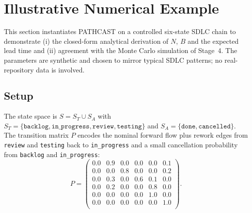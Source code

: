 %

\section{Illustrative Numerical Example}
\label{sec:numerical-example}

This section instantiates PATHCAST on a controlled six-state SDLC
chain to demonstrate (i) the closed-form analytical derivation of
$N$, $B$ and the expected lead time and (ii) agreement with the
Monte Carlo simulation of Stage~4. The parameters are synthetic and
chosen to mirror typical SDLC patterns; no real-repository data is
involved.

\subsection{Setup}
\label{sec:num-setup}

The state space is $S = S_T \cup S_A$ with
$S_T = \{\texttt{backlog}, \texttt{in\_progress}, \texttt{review},
\texttt{testing}\}$ and
$S_A = \{\texttt{done}, \texttt{cancelled}\}$. The transition matrix
$P$ encodes the nominal forward flow plus rework edges from
\texttt{review} and \texttt{testing} back to \texttt{in\_progress}
and a small cancellation probability from \texttt{backlog} and
\texttt{in\_progress}:
\[
P =
\begin{pmatrix}
0.0 & 0.9 & 0.0 & 0.0 & 0.0 & 0.1 \\
0.0 & 0.0 & 0.8 & 0.0 & 0.0 & 0.2 \\
0.0 & 0.3 & 0.0 & 0.6 & 0.1 & 0.0 \\
0.0 & 0.2 & 0.0 & 0.0 & 0.8 & 0.0 \\
0.0 & 0.0 & 0.0 & 0.0 & 1.0 & 0.0 \\
0.0 & 0.0 & 0.0 & 0.0 & 0.0 & 1.0 \\
\end{pmatrix}.
\]

